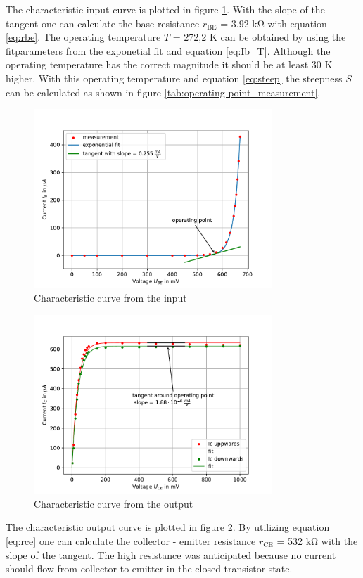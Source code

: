 \documentclass[11pt, a4paper]{article}
\begin{document}
The characteristic input curve is plotted in figure \ref{fig:Eincur}. With the slope of the tangent one can calculate the base resistance $r_{\text{BE}}$ = 3.92 \si{\kilo\ohm} with equation \ref{eq:rbe}. 
The operating temperature $T$ = 272,2 \si{\kelvin} can be obtained by using the fitparameters from the exponetial fit and equation \ref{eq:Ib_T}. Although the operating temperature has the correct magnitude it should be at least 30 \si{\kelvin} higher.
With this operating temperature and equation \ref{eq:steep} the steepness $S$ can be calculated as shown in figure \ref{tab:operating point_measurement}.

\begin{figure}[h]
    \centering
    \includegraphics[width=0.8\textwidth]{plots/Eingangskennlinie.pdf}
    \caption{Characteristic curve from the input}
    \label{fig:Eincur}
\end{figure}

\begin{figure}[h]
    \centering
    \includegraphics[width=0.8\textwidth]{plots/Ausgangskennlinie.pdf}
    \caption{Characteristic curve from the output}
    \label{fig:Outcur}
\end{figure}
The characteristic output curve is plotted in figure \ref{fig:Outcur}. By utilizing equation \ref{eq:rce} one can calculate the collector - emitter resistance $r_{\text{CE}}$ = 532 \si{\kilo\ohm} with the slope of the tangent.
The high resistance was anticipated because no current should flow from collector to emitter in the closed transistor state.
\FloatBarrier
\end{document}
